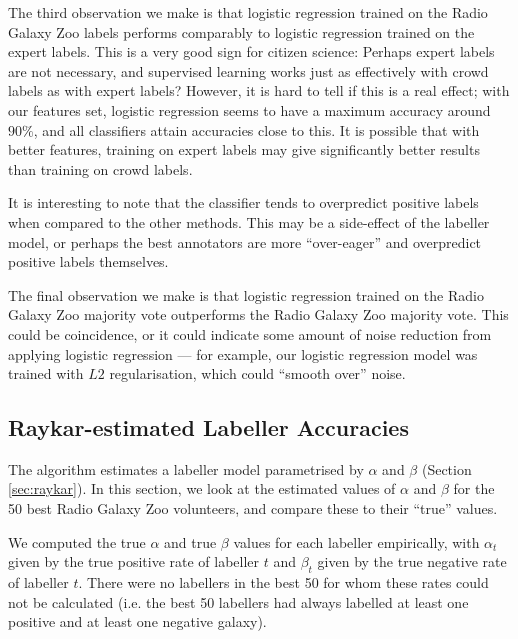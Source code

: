     The third observation we make is that logistic regression trained on the
    Radio Galaxy Zoo labels performs comparably to logistic regression trained
    on the expert labels. This is a very good sign for citizen science: Perhaps
    expert labels are not necessary, and supervised learning works just as
    effectively with crowd labels as with expert labels? However, it is hard to
    tell if this is a real effect; with our features set, logistic regression
    seems to have a maximum accuracy around $90\%$, and all classifiers attain
    accuracies close to this. It is possible that with better features, training
    on expert labels may give significantly better results than training on
    crowd labels.

    It is interesting to note that the \citeauthor{raykar10} classifier tends to
    overpredict positive labels when compared to the other methods. This may be
    a side-effect of the labeller model, or perhaps the best annotators are more
    ``over-eager'' and overpredict positive labels themselves.

    The final observation we make is that logistic regression trained on the
    Radio Galaxy Zoo majority vote outperforms the Radio Galaxy Zoo majority
    vote. This could be coincidence, or it could indicate some amount of noise
    reduction from applying logistic regression --- for example, our logistic
    regression model was trained with $L2$ regularisation, which could ``smooth
    over'' noise.

  \subsection{Raykar-estimated Labeller Accuracies}
  \label{sec:raykar-estimates-rgz}

    The \citeauthor{raykar10} algorithm estimates a labeller model parametrised
    by $\alpha$ and $\beta$ (Section \ref{sec:raykar}). In this section, we look
    at the estimated values of $\alpha$ and $\beta$ for the 50 best Radio Galaxy
    Zoo volunteers, and compare these to their ``true'' values.

    We computed the true $\alpha$ and true $\beta$ values for each labeller
    empirically, with $\alpha_t$ given by the true positive rate of labeller $t$
    and $\beta_t$ given by the true negative rate of labeller $t$. There were no
    labellers in the best 50 for whom these rates could not be calculated (i.e.
    the best 50 labellers had always labelled at least one positive and at least
    one negative galaxy).

